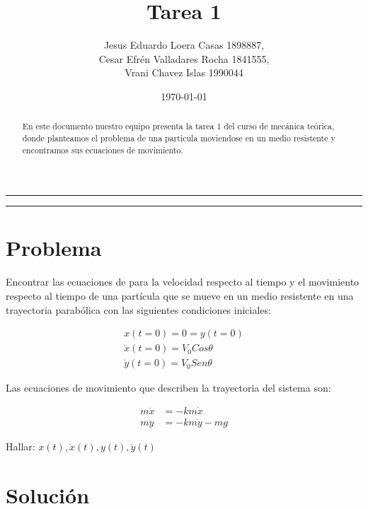\documentclass{article}
\title{Tarea 1}
\author{Jesus Eduardo Loera Casas 1898887,\\ Cesar Efrén Valladares Rocha 1841555,\\ Vrani Chavez Islas 1990044}
\date{\today}
\begin{document}


\tableofcontents			%

\begin{center}
	\rule[0mm]{150mm}{0.1mm}		%
	\end{center}
	
	
\begin{abstract}		%

	\noindent 				%
	En este documento nuestro equipo presenta la tarea 1 del curso de mecánica teórica, donde planteamos 
  el problema de una particula moviendose en un medio resistente y encontramos sus ecuaciones de 
  movimiento.
	\end{abstract}
	
\begin{center}
	\rule[0mm]{150mm}{0.1mm}
	\end{center}

  \section{Problema}		
                            
  Encontrar las ecuaciones de para la velocidad respecto al tiempo y el movimiento respecto
  al tiempo de una partícula que se mueve en un medio resistente en una trayectoria parabólica 
  con las siguientes condiciones iniciales:

  \begin{gather*}
    x(t=0)=0=y(t=0) \\
    \dot{x} (t=0) = V_{0} Cos\theta \\
    \dot{y} (t=0) = V_{0} Sen\theta 
  \end{gather*}

  Las ecuaciones de movimiento que describen la trayectoria del sistema son:

  \begin{align*}
    m\ddot{x} &= -km\dot{x} \\
    m\ddot{y} &= -km\dot{y}-mg
  \end{align*}

  Hallar: $ x(t), \dot{x} (t) , y(t), \dot{y} (t) $

\section{Solución}

 

 
\end{document}
